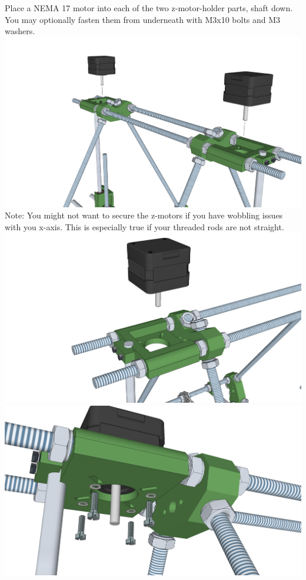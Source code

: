 \documentclass[twoside,openany,a4paper,titlepage]{memoir}
\begin{document}
	\section{}
	Place a NEMA 17 motor into each of the two z-motor-holder parts, shaft down. You
	may optionally fasten them from underneath with M3x10 bolts and M3 washers.\\
	\includegraphics[width=1\linewidth]{graphics/ch8_19_1.png}	
	Note: You might not want to secure the z-motors if you have wobbling issues with you x-axis. This is
	especially true if your threaded rods are not straight.\\
	\includegraphics[width=1\linewidth]{graphics/ch8_19_2.png}
	\includegraphics[width=1\linewidth]{graphics/ch8_19_3.png}
\end{document}
